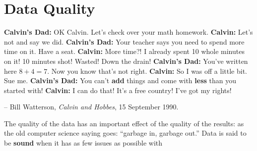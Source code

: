 \section{Data Quality}
\begin{tcolorbox}[title=The Importance of Validation]
\textbf{Calvin's Dad:} OK Calvin. Let's check over your math homework. \newline
\textbf{Calvin:} Let's not and say we did. \newline
\textbf{Calvin's Dad:} Your teacher says you need to spend more time on it. Have a seat. \newline
\textbf{Calvin:} More time?! I already spent 10 whole minutes on it! 10 minutes shot! Wasted! Down the drain!\newline
\textbf{Calvin's Dad:} You've written here $8+4=7$. Now you know that's not right. \newline
\textbf{Calvin:} So I was off a little bit. Sue me.\newline
\textbf{Calvin's Dad:} You can't \textbf{add} things and come with \textbf{less} than you started with!\newline
\textbf{Calvin:} I can do that! It's a free country! I've got my rights!
\\[-0.6cm]
\begin{flushright}
-- Bill Watterson, \textit{Calvin and Hobbes}, 15 September 1990.
\end{flushright}
\end{tcolorbox}
\noindent
The quality of the data has an important effect of the quality of the results: as the old computer science saying goes: ``garbage in, garbage out.''
\newl Data is said to be \textbf{sound} when it has as few issues as possible with 
